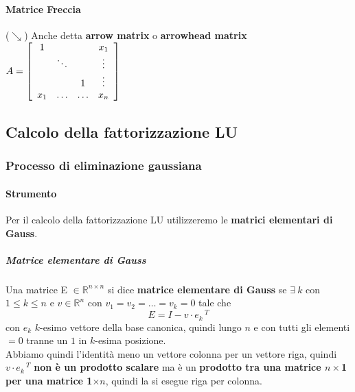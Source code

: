 \documentclass[10pt]{book}
\begin{document}
\paragraph{Matrice Freccia} ($\searrow$) Anche detta \textbf{arrow matrix} o \textbf{arrowhead matrix} \begin{math}
A = \left[
\begin{array}{c c c c}
	1 & & & x_1\\
	& \ddots & & \vdots\\
	& & 1 & \vdots\\
	x_1 & \ldots & \ldots & x_n
\end{array}
\right]
\end{math}
\subsection{Calcolo della fattorizzazione LU}
\subsubsection{Processo di eliminazione gaussiana}
\paragraph{Strumento} Per il calcolo della fattorizzazione LU utilizzeremo le \textbf{matrici elementari di Gauss}.
\subparagraph{Matrice elementare di Gauss} Una matrice E $\in \mathbb{R}^{n\times n}$ si dice \textbf{matrice elementare di Gauss} se $\exists\: k$ con $1 \leq k \leq n$ e $v \in \mathbb{R}^n$ con $v_1 = v_2 = \ldots = v_k = 0$ tale che $$E = I - v\cdot e_k\,^T$$
con $e_k$ $k$-esimo vettore della base canonica, quindi lungo $n$ e con tutti gli elementi $= 0$ tranne un $1$ in $k$-esima posizione.\\
Abbiamo quindi l'identità meno un vettore colonna per un vettore riga, quindi $v\cdot e_k\,^T$ \textbf{non è un prodotto scalare} ma è un \textbf{prodotto tra una matrice $n\times$1 per una matrice 1$\times n$}, quindi la si esegue riga per colonna.
\end{document}
